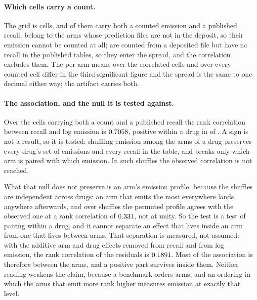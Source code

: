 \documentclass[journal=jcisd8,manuscript=suppinfo,layout=onecolumn]{achemso}
\begin{document}
\paragraph{Which cells carry a count.} The grid is \numExtbudgetGrid{} cells, and
\numExtbudgetCountedcells{} of them carry both a counted emission and a published recall.
\numExtbudgetAbsentnodeposit{} belong to the \numExtbudgetArmsnotdepositedWord{} arms whose
prediction files are not in the deposit, so their emission cannot be counted at all;
\numExtbudgetAbsentnorecallWord{} are counted from a deposited file but have no recall in the
published tables, so they enter the spread, and the correlation excludes them. The per-arm means
over the correlated cells and over every counted cell differ in the third significant figure and
the spread is the same to one decimal either way; the artifact carries both.

\paragraph{The association, and the null it is tested against.} Over the
\numExtbudgetCountedcells{} cells carrying both a count and a published recall the rank correlation
between recall and log emission is $0.7058$, positive within a drug in
\numExtbudgetWithinpositive{} of \numExtbudgetWithinn{}. A sign is not a result, so it is tested:
shuffling emission among the arms of a drug preserves every drug's set of emissions and every
recall in the table, and breaks only which arm is paired with which emission. In
\numExtbudgetPermutations{} such shuffles the observed correlation is not reached.

What that null does not preserve is an arm's emission profile, because the shuffles are independent
across drugs: an arm that emits the most everywhere lands anywhere afterwards, and over
\numExtbudgetProfilepermutations{} shuffles the permuted profile agrees with the observed one at a
rank correlation of $0.331$, not at unity. So the test is a test of
pairing within a drug, and it cannot separate an effect that lives inside an arm from one that
lives between arms. That separation is measured, not assumed: with the additive arm and drug
effects removed from recall and from log emission, the rank correlation of the residuals is
$0.1891$. Most of the association is therefore between the arms, and a positive part
survives inside them. Neither reading weakens the claim, because a benchmark orders arms, and an
ordering in which the arms that emit more rank higher measures emission at exactly that level.
\end{document}
